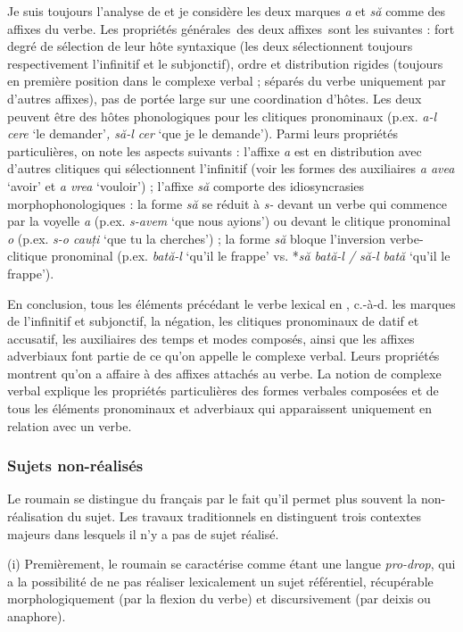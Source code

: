 Je suis toujours l'analyse de \citet{Barbu1999} et je considère les deux marques \textit{a} et \textit{să} comme des affixes du verbe. Les propriétés générales~des deux affixes~sont les suivantes : fort degré de sélection de leur hôte syntaxique (les deux sélectionnent toujours respectivement l'infinitif et le subjonctif), ordre et distribution rigides (toujours en première position dans le complexe verbal ; séparés du verbe uniquement par d'autres affixes), pas de portée large sur une coordination d'hôtes. Les deux peuvent être des hôtes phonologiques pour les clitiques pronominaux (p.ex. \textit{a-l cere} `le demander'\textit{, să-l cer} `que je le demande'). Parmi leurs propriétés particulières, on note les aspects suivants : l'affixe \textit{a} est en distribution avec d'autres clitiques qui sélectionnent l'infinitif (voir les formes des auxiliaires \textit{a avea} `avoir' et \textit{a vrea} `vouloir') ; l'affixe \textit{să} comporte des idiosyncrasies morphophonologiques : la forme \textit{să} se réduit à \textit{s-} devant un verbe qui commence par la voyelle \textit{a} (p.ex. \textit{s-avem} `que nous ayions') ou devant le clitique pronominal \textit{o} (p.ex. \textit{s-o cauți} `que tu la cherches') ; la forme \textit{să} bloque l'inversion verbe-clitique pronominal (p.ex. \textit{bată-l} `qu'il le frappe' vs. *\textit{să bată-l / să-l bată} `qu'il le frappe').

En conclusion, tous les éléments précédant le verbe lexical en , c.-à-d. les marques de l'infinitif et subjonctif, la négation, les clitiques pronominaux de datif et accusatif, les auxiliaires des temps et modes composés, ainsi que les affixes adverbiaux font partie de ce qu'on appelle le complexe verbal. Leurs propriétés montrent qu'on a affaire à des affixes attachés au verbe. La notion de complexe verbal explique les propriétés particulières des formes verbales composées et de tous les éléments pronominaux et adverbiaux qui apparaissent uniquement en relation avec un verbe.  

\subsubsection{Sujets non-réalisés} 
Le roumain se distingue du français par le fait qu'il permet plus souvent la non-réalisation du sujet. Les travaux traditionnels en distinguent trois contextes majeurs dans lesquels il n'y a pas de sujet réalisé.  

(i) Premièrement, le roumain se caractérise comme étant une langue \textit{pro-drop}, qui a la possibilité de ne pas réaliser lexicalement un sujet référentiel, récupérable morphologiquement (par la flexion du verbe) et discursivement (par deixis ou anaphore). 



